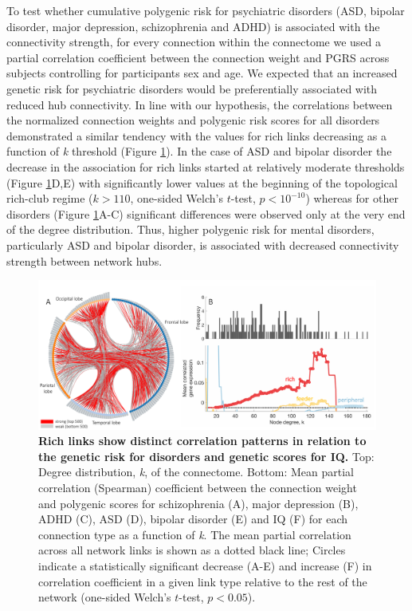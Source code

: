 To test whether cumulative polygenic risk for psychiatric disorders (ASD, bipolar disorder, major depression, schizophrenia and ADHD) is associated with the connectivity strength, for every connection within the connectome we used a partial correlation coefficient between the connection weight and PGRS across subjects controlling for participants sex and age. We expected that an increased genetic risk for psychiatric disorders would be preferentially associated with reduced hub connectivity. In line with our hypothesis, the correlations between the normalized connection weights and polygenic risk scores for all disorders demonstrated a similar tendency with the values for rich links decreasing as a function of \textit{k} threshold (Figure \ref{fig:Ch5Fig5}). In the case of ASD and bipolar disorder the decrease in the association for rich links started at relatively moderate thresholds (Figure \ref{fig:Ch5Fig5}D,E) with significantly lower values at the beginning of the topological rich-club regime ($k>110$, one-sided Welch's $t$-test, $p < 10^{-10}$) whereas for other disorders (Figure \ref{fig:Ch5Fig5}A-C) significant differences were observed only at the very end of the degree distribution. Thus, higher polygenic risk for mental disorders, particularly ASD and bipolar disorder, is associated with decreased connectivity strength between network hubs.

\begin{figure}[h!]
\begin{center}
\includegraphics[width=1\textwidth]{Chapter5/Ch5Fig5.pdf}%
\end{center}
\caption{\textbf{Rich links show distinct correlation patterns in relation to the genetic risk for disorders and genetic scores for IQ.}
Top: Degree distribution, \textit{k}, of the connectome. Bottom: Mean partial correlation (Spearman) coefficient between the connection weight and polygenic scores for schizophrenia (A), major depression (B), ADHD (C), ASD (D), bipolar disorder (E) and IQ (F) for each connection type as a function of \textit{k}. The mean partial correlation across all network links is shown as a dotted black line; Circles indicate a statistically significant decrease (A-E) and increase (F) in correlation coefficient in a given link type relative to the rest of the network (one-sided Welch's $t$-test, $p < 0.05$).}
\label{fig:Ch5Fig5}
\end{figure}

